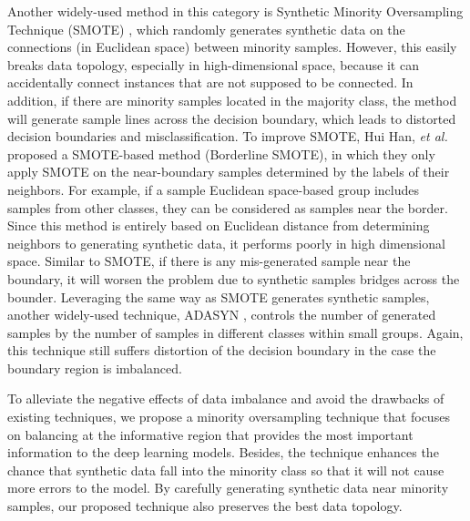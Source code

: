 \documentclass[final,5p,times, twocolumn]{elsarticle}
\begin{document}
	Another widely-used method in this category is Synthetic Minority Oversampling Technique (SMOTE) \cite{chawla_smote:_2002}, which randomly generates synthetic data on the connections (in Euclidean space) between minority samples. However, this easily breaks data topology, especially in high-dimensional space, because it can accidentally connect instances that are not supposed to be connected. In addition, if there are minority samples located in the majority class, the method will generate sample lines across the decision boundary, which leads to distorted decision boundaries and misclassification. To improve SMOTE, Hui Han, \textit{et al.} \cite{bordersmote} proposed a SMOTE-based method (Borderline SMOTE), in which they only apply SMOTE on the near-boundary samples determined by the labels of their neighbors. For example, if a sample Euclidean space-based group includes samples from other classes, they can be considered as samples near the border. Since this method is entirely based on Euclidean distance from determining neighbors to generating synthetic data, it performs poorly in high dimensional space. Similar to SMOTE, if there is any mis-generated sample near the boundary, it will worsen the problem due to synthetic samples bridges across the bounder. Leveraging the same way as SMOTE generates synthetic samples, another widely-used technique, ADASYN \cite{ADASYN}, controls the number of generated samples by the number of samples in different classes within small groups. Again, this technique still suffers distortion of the decision boundary in the case the boundary region is imbalanced.    
	
	To alleviate the negative effects of data imbalance and avoid the drawbacks of existing techniques, we propose a minority oversampling technique that focuses on balancing at the informative region that provides the most important information to the deep learning models. Besides, the technique enhances the chance that synthetic data fall into the minority class so that it will not cause more errors to the model. By carefully generating synthetic data near minority samples, our proposed technique also preserves the best data topology.
	
\end{document}

